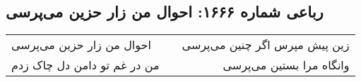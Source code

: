 \begin{center}
\section*{رباعی شماره ۱۶۶۶: احوال من زار حزین می‌پرسی}
\label{sec:1666}
\begin{longtable}{l p{0.5cm} r}
احوال من زار حزین می‌پرسی
&&
زین پیش مپرس اگر چنین می‌پرسی
\\
من در غم تو دامن دل چاک زدم
&&
وانگاه مرا بستین می‌پرسی
\\
\end{longtable}
\end{center}
